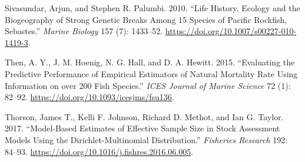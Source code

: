 \documentclass[11pt,
  english,
  a4paper,
]{article}
\begin{document}
\begin{cslreferences}
\leavevmode\hypertarget{ref-sivasundar_life_2010}{}%
Sivasundar, Arjun, and Stephen R. Palumbi. 2010. ``Life History, Ecology and the Biogeography of Strong Genetic Breaks Among 15 Species of Pacific Rockfish, Sebastes.'' \emph{Marine Biology} 157 (7): 1433--52. \url{https://doi.org/10.1007/s00227-010-1419-3}.

\leavevmode\hypertarget{ref-then_evaluating_2015-1}{}%
Then, A. Y., J. M. Hoenig, N. G. Hall, and D. A. Hewitt. 2015. ``Evaluating the Predictive Performance of Empirical Estimators of Natural Mortality Rate Using Information on over 200 Fish Species.'' \emph{ICES Journal of Marine Science} 72 (1): 82--92. \url{https://doi.org/10.1093/icesjms/fsu136}.

\leavevmode\hypertarget{ref-thorson_model-based_2017}{}%
Thorson, James T., Kelli F. Johnson, Richard D. Methot, and Ian G. Taylor. 2017. ``Model-Based Estimates of Effective Sample Size in Stock Assessment Models Using the Dirichlet-Multinomial Distribution.'' \emph{Fisheries Research} 192: 84--93. \url{https://doi.org/10.1016/j.fishres.2016.06.005}.
\end{cslreferences}
\end{document}
